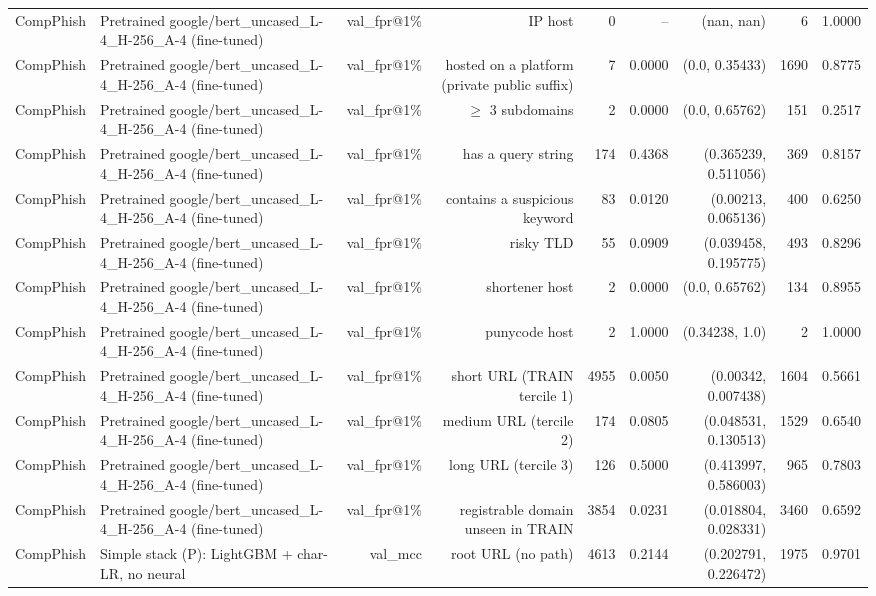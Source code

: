 \begin{table}[t]
\begin{tabular}{llrrrrrrr}
CompPhish & Pretrained google/bert\_uncased\_L-4\_H-256\_A-4 (fine-tuned) & val\_fpr@1\% & IP host & 0 & -- & (nan, nan) & 6 & 1.0000 \\
CompPhish & Pretrained google/bert\_uncased\_L-4\_H-256\_A-4 (fine-tuned) & val\_fpr@1\% & hosted on a platform (private public suffix) & 7 & 0.0000 & (0.0, 0.35433) & 1690 & 0.8775 \\
CompPhish & Pretrained google/bert\_uncased\_L-4\_H-256\_A-4 (fine-tuned) & val\_fpr@1\% & $\geq$ 3 subdomains & 2 & 0.0000 & (0.0, 0.65762) & 151 & 0.2517 \\
CompPhish & Pretrained google/bert\_uncased\_L-4\_H-256\_A-4 (fine-tuned) & val\_fpr@1\% & has a query string & 174 & 0.4368 & (0.365239, 0.511056) & 369 & 0.8157 \\
CompPhish & Pretrained google/bert\_uncased\_L-4\_H-256\_A-4 (fine-tuned) & val\_fpr@1\% & contains a suspicious keyword & 83 & 0.0120 & (0.00213, 0.065136) & 400 & 0.6250 \\
CompPhish & Pretrained google/bert\_uncased\_L-4\_H-256\_A-4 (fine-tuned) & val\_fpr@1\% & risky TLD & 55 & 0.0909 & (0.039458, 0.195775) & 493 & 0.8296 \\
CompPhish & Pretrained google/bert\_uncased\_L-4\_H-256\_A-4 (fine-tuned) & val\_fpr@1\% & shortener host & 2 & 0.0000 & (0.0, 0.65762) & 134 & 0.8955 \\
CompPhish & Pretrained google/bert\_uncased\_L-4\_H-256\_A-4 (fine-tuned) & val\_fpr@1\% & punycode host & 2 & 1.0000 & (0.34238, 1.0) & 2 & 1.0000 \\
CompPhish & Pretrained google/bert\_uncased\_L-4\_H-256\_A-4 (fine-tuned) & val\_fpr@1\% & short URL (TRAIN tercile 1) & 4955 & 0.0050 & (0.00342, 0.007438) & 1604 & 0.5661 \\
CompPhish & Pretrained google/bert\_uncased\_L-4\_H-256\_A-4 (fine-tuned) & val\_fpr@1\% & medium URL (tercile 2) & 174 & 0.0805 & (0.048531, 0.130513) & 1529 & 0.6540 \\
CompPhish & Pretrained google/bert\_uncased\_L-4\_H-256\_A-4 (fine-tuned) & val\_fpr@1\% & long URL (tercile 3) & 126 & 0.5000 & (0.413997, 0.586003) & 965 & 0.7803 \\
CompPhish & Pretrained google/bert\_uncased\_L-4\_H-256\_A-4 (fine-tuned) & val\_fpr@1\% & registrable domain unseen in TRAIN & 3854 & 0.0231 & (0.018804, 0.028331) & 3460 & 0.6592 \\
CompPhish & Simple stack (P): LightGBM + char-LR, no neural & val\_mcc & root URL (no path) & 4613 & 0.2144 & (0.202791, 0.226472) & 1975 & 0.9701 \\

\end{tabular}
\end{table}

